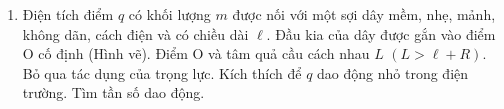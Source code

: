 \begin{vd}
\begin{enumerate}[1)]
\begin{center}

     \end{center}
     \item Điện tích điểm $q$ có khối lượng $m$ được nối với một sợi dây mềm, nhẹ, mảnh, không dãn, cách điện và có chiều dài $\ell .$ Đầu kia của dây được gắn vào điểm O cố định (Hình vẽ). Điểm O và tâm quả cầu cách nhau $L$ $(L>\ell +R)$. Bỏ qua tác dụng của trọng lực. Kích thích để $q$ dao động nhỏ trong điện trường. Tìm tần số dao động.
     \begin{center}
         


\begin{tikzpicture}[x=0.75pt,y=0.75pt,yscale=-1,xscale=1]


\end{tikzpicture}
\end{center}
\end{enumerate}
\end{vd}

